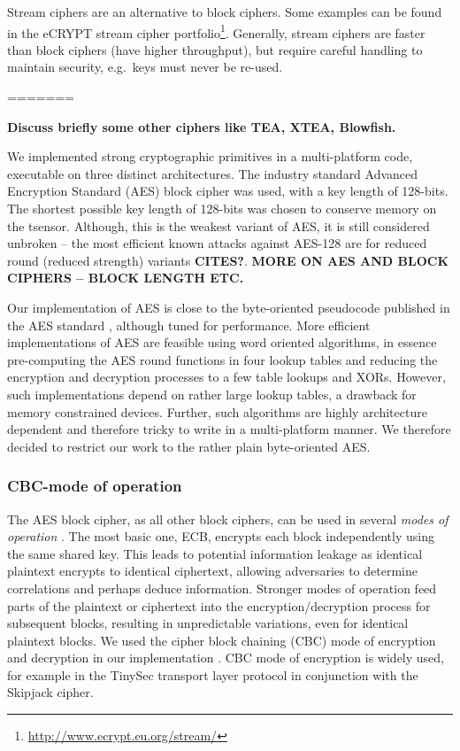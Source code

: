 Stream ciphers are an alternative to block ciphers. Some examples can be found in the eCRYPT stream cipher portfolio\footnote{\url{http://www.ecrypt.eu.org/stream/}}. Generally, stream ciphers are faster than block ciphers (have higher throughput), but require careful handling to maintain security, e.g.\ keys must never be re-used.

=======

\textbf{Discuss briefly some other ciphers like TEA, XTEA, Blowfish.}

We implemented strong cryptographic primitives in a multi-platform code, executable on three distinct architectures. The industry standard Advanced Encryption Standard (AES) block cipher was used, with a key length of 128-bits. The shortest possible key length of 128-bits was chosen to conserve memory on the tsensor. Although, this is the weakest variant of AES, it is still considered unbroken -- the most efficient known attacks against AES-128 are for reduced round (reduced strength) variants \textbf{CITES?}. \textbf{MORE ON AES AND BLOCK CIPHERS -- BLOCK LENGTH ETC.}

Our implementation of AES is close to the byte-oriented pseudocode published in the AES standard \cite{}, although tuned for performance. More efficient implementations of AES are feasible using word oriented algorithms, in essence pre-computing the AES round functions in four lookup tables and reducing the encryption and decryption processes to a few table lookups and XORs. However, such implementations depend on rather large lookup tables, a drawback for memory constrained devices. Further, such algorithms are highly architecture dependent and therefore tricky to write in a multi-platform manner. We therefore decided to restrict our work to the rather plain byte-oriented AES.


\subsubsection{CBC-mode of operation}

The AES block cipher, as all other block ciphers, can be used in several \textit{modes of operation} \cite{}. The most basic one, ECB, encrypts each block independently using the same shared key.  This leads to potential information leakage as identical plaintext encrypts to identical ciphertext, allowing adversaries to determine correlations and perhaps deduce information. Stronger modes of operation feed parts of the plaintext or ciphertext into the encryption/decryption process for subsequent blocks, resulting in unpredictable variations, even for identical plaintext blocks. We used the cipher block chaining (CBC) mode of encryption and decryption in our implementation \cite{}. CBC mode of encryption is widely used, for example in the TinySec transport layer protocol  in conjunction with the Skipjack \cite{} cipher.

